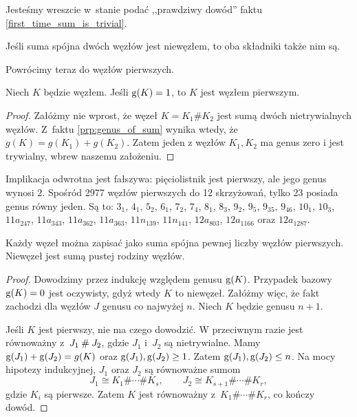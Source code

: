 Jesteśmy wreszcie w~stanie podać ,,prawdziwy dowód'' faktu \ref{first_time_sum_is_trivial}.

\begin{corollary}
\label{cor:connected_sum_no_inverses}%
    Jeśli suma spójna dwóch węzłów jest niewęzłem, to oba składniki także nim są.
\end{corollary}

Powrócimy teraz do węzłów pierwszych.
%

\begin{proposition}
    Niech $K$ będzie węzłem.
    Jeśli $\operatorname{g} (K) = 1$, to $K$ jest węzłem pierwszym.
\end{proposition}

\begin{proof}
    Załóżmy nie wprost, że węzeł $K = K_1 \# K_2$ jest sumą dwóch nietrywialnych węzłów.
    Z~faktu \ref{prp:genus_of_sum} wynika wtedy, że $g(K) = g(K_1) + g(K_2)$.
    Zatem jeden z węzłów $K_1, K_2$ ma genus zero i jest trywialny, wbrew naszemu założeniu.
\end{proof}

Implikacja odwrotna jest fałszywa: pięciolistnik jest pierwszy, ale jego genus wynosi $2$.
Spośród 2977 węzłów pierwszych do 12 skrzyżowań, tylko 23 posiada genus równy jeden.
Są to: $3_{1}$, $4_{1}$, $5_{2}$, $6_{1}$, $7_{2}$, $7_{4}$, $8_{1}$, $8_{3}$, $9_{2}$, $9_{5}$, $9_{35}$, $9_{46}$, $10_{1}$, $10_{3}$, $11a_{247}$, $11a_{343}$, $11a_{362}$, $11a_{363}$, $11n_{139}$, $11n_{141}$, $12a_{803}$, $12a_{1166}$ oraz $12a_{1287}$.

\begin{proposition}
    Każdy węzeł można zapisać jako suma spójna pewnej liczby węzłów pierwszych.
    Niewęzeł jest sumą pustej rodziny węzłów.
\end{proposition}

\begin{proof}
    Dowodzimy przez indukcję względem genusu $\operatorname{g} (K)$.
    Przypadek bazowy $\operatorname{g} (K) = 0$ jest oczywisty, gdyż wtedy $K$ to niewęzeł.
    Załóżmy więc, że fakt zachodzi dla węzłów $J$ genusu co najwyżej $n$.
    Niech $K$ będzie genusu $n + 1$.

    Jeśli $K$ jest pierwszy, nie ma czego dowodzić.
    W przeciwnym razie jest równoważny z~$J_1 \mathbin{\#} J_2$, gdzie $J_1$ i~$J_2$ są nietrywialne.
    Mamy $\operatorname{g} (J_1) + \operatorname{g} (J_2) = g(K)$ oraz $\operatorname{g}(J_1), \operatorname{g}(J_2) \ge 1$.
    Zatem $\operatorname{g}(J_1), \operatorname{g}(J_2) \le n$.
    Na mocy hipotezy indukcyjnej, $J_1$ oraz $J_2$ są równoważne sumom
    \[
        J_1 \cong K_1 \# \cdots \# K_s, \qquad
        J_2 \cong K_{s+1} \# \cdots \# K_r,
    \]
    gdzie $K_i$ są pierwsze.
    Zatem $K$ jest równoważny z~$K_1\#\cdots\# K_r$, co kończy dowód.
\end{proof}

